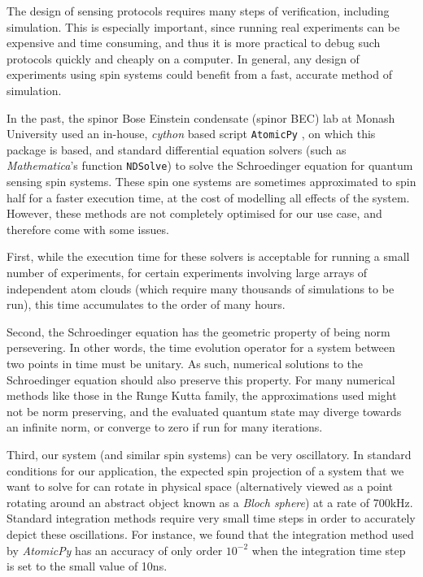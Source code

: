 \documentclass{jors}
\begin{document}
	The design of sensing protocols requires many steps of verification, including simulation. This is especially important, since running real experiments can be expensive and time consuming, and thus it is more practical to debug such protocols quickly and cheaply on a computer. In general, any design of experiments using spin systems could benefit from a fast, accurate method of simulation.

	In the past, the spinor Bose Einstein condensate (spinor BEC) lab at Monash University used an in-house, \emph{cython} based script \texttt{AtomicPy} \cite{morris_qcmonkatomicpy_2018}, on which this package is based, and standard differential equation solvers (such as \emph{Mathematica}'s function \texttt{NDSolve}) to solve the Schroedinger equation for quantum sensing spin systems. These spin one systems  are sometimes approximated to spin half for a faster execution time, at the cost of modelling all effects of the system. However, these methods are not completely optimised for our use case, and therefore come with some issues.

	First, while the execution time for these solvers is acceptable for running a small number of experiments, for certain experiments involving large arrays of independent atom clouds (which require many thousands of simulations to be run), this time accumulates to the order of many hours.

	Second, the Schroedinger equation has the geometric property of being norm persevering. In other words, the time evolution operator for a system between two points in time must be unitary. As such, numerical solutions to the Schroedinger equation should also preserve this property. For many numerical methods like those in the Runge Kutta family, the approximations used might not be norm preserving, and the evaluated quantum state may diverge towards an infinite norm, or converge to zero if run for many iterations.

	Third, our system (and similar spin systems) can be very oscillatory. In standard conditions for our application, the expected spin projection of a system that we want to solve for can rotate in physical space (alternatively viewed as a point rotating around an abstract object known as a \emph{Bloch sphere}) at a rate of 700kHz. Standard integration methods require very small time steps in order to accurately depict these oscillations. For instance, we found that the integration method used by \emph{AtomicPy} has an accuracy of only order \(10^{-2}\) when the integration time step is set to the small value of 10ns.
\end{document}

